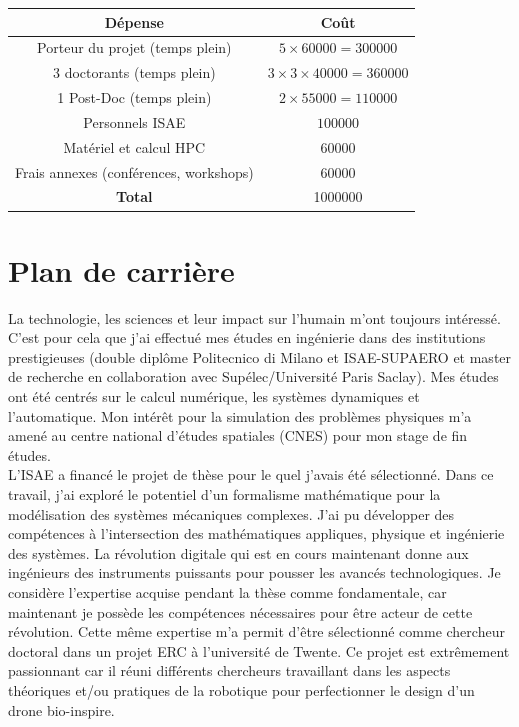 \documentclass[12pt, french]{article}
\begin{document}
\begin{center}
\begin{tabular}{|c|c|}
	\hline
	D\'epense & Co\^{u}t \\
	\hline
	Porteur du projet (temps plein) & $5\times 60000=300000$ \\
	3 doctorants (temps plein) & $3\times 3\times 40000=360000$  \\
	1 Post-Doc (temps plein) & $2\times 55000=110000$ \\
	Personnels ISAE & $100000$ \\
	Matériel  et calcul HPC & $60000$ \\
	Frais annexes (conférences, workshops) & $60000$ \\
	\hline
	\textbf{Total} & 1000000 \\
	\hline
\end{tabular}
\end{center}



\section{Plan de carrière}

La technologie, les sciences et leur impact sur l'humain m'ont toujours intéressé. C'est pour cela que j'ai effectué mes études en ingénierie dans des institutions prestigieuses (double diplôme Politecnico di Milano et ISAE-SUPAERO et master de recherche en collaboration avec Supélec/Université Paris Saclay). Mes études ont été centrés sur le calcul numérique, les systèmes dynamiques et l'automatique. Mon intérêt pour la simulation des problèmes physiques m'a amené au centre national d'études spatiales (CNES) pour mon stage de fin études. \\

L'ISAE a financé le projet de thèse pour le quel j'avais été sélectionné. Dans ce travail, j'ai exploré le potentiel d'un formalisme mathématique pour la modélisation des systèmes mécaniques complexes. J'ai pu développer des compétences à l'intersection des mathématiques appliques, physique et ingénierie des systèmes. La révolution digitale qui est en cours maintenant donne aux ingénieurs des instruments puissants pour pousser les avancés technologiques. Je considère l'expertise acquise pendant la thèse comme fondamentale, car maintenant je possède les compétences nécessaires pour être acteur de cette révolution. Cette même expertise m'a permit d'être sélectionné comme chercheur doctoral dans un projet ERC à l'université de Twente. Ce projet est extrêmement passionnant car il réuni différents chercheurs travaillant dans les aspects théoriques et/ou pratiques de la robotique pour perfectionner le design d'un drone bio-inspire. \\
\end{document}

